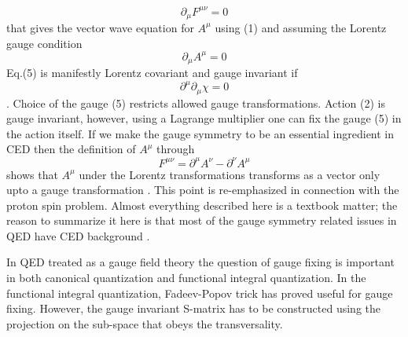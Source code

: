 \documentclass[aps, singlecolumn, showpacs]{revtex4-2}
\begin{document}
\begin{equation}
\partial_\mu F^{\mu\nu} =0
\end{equation}
that gives the vector wave equation for $A^\mu$ using (1) and assuming the Lorentz gauge condition
\begin{equation}
\partial_\mu A^\mu =0
\end{equation}
Eq.(5) is manifestly Lorentz covariant and gauge invariant if 
\begin{equation}
\partial^\mu \partial_\mu \chi =0
\end{equation}.
Choice of the gauge (5) restricts allowed gauge transformations. Action (2) is gauge invariant, however, using a Lagrange multiplier one can fix the gauge (5) in the action itself. If we make the gauge symmetry to be an essential ingredient in CED then the definition of $A^\mu$ through 
\begin{equation}
F^{\mu\nu} =\partial^\mu A^\nu - \partial^\nu A^\mu
\end{equation}
shows that $A^\mu$ under the Lorentz transformations transforms as a vector only upto a gauge transformation \cite{23}. This point is re-emphasized \cite{4} in connection with the proton spin problem. Almost everything described here is a textbook matter; the reason to summarize it here is that most of the gauge symmetry related issues in QED have CED background \cite{2}.

In QED treated as a gauge field theory the question of gauge fixing is important in both canonical quantization and functional integral quantization. In the functional integral quantization, Fadeev-Popov trick has proved useful for gauge fixing. However, the gauge invariant S-matrix has to be constructed using the projection on the sub-space that obeys the transversality. 
\end{document}
